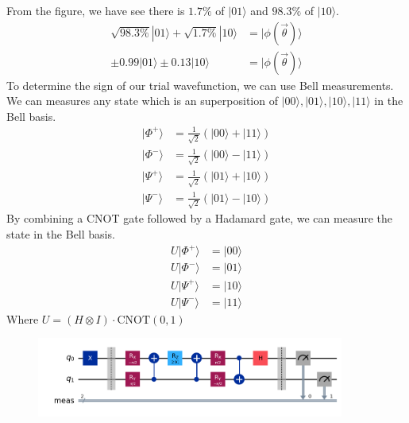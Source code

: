 \documentclass{article}
\begin{document}
\begin{itemize}
    From the figure, we have see there is \(1.7 \% \) of \(|01\rangle\) and \(98.3 \%\) of \(|10\rangle\). 
    \begin{align*}
        \sqrt{98.3 \%}|01\rangle +\sqrt{1.7 \% } |10\rangle &= |\phi(\vec{\theta}) \rangle \\
        \pm 0.99 |01\rangle \pm 0.13 |10\rangle &= |\phi(\vec{\theta}) \rangle
    \end{align*}
    To determine the sign of our trial wavefunction, we can use Bell measurements. We can measures any state which is an superposition of \(|00\rangle, |01\rangle, |10\rangle , |11\rangle\) in the Bell basis.
    \begin{align*}
        |\Phi^+\rangle &= \frac{1}{\sqrt{2}}(|00\rangle + |11\rangle)\\
        |\Phi^-\rangle &= \frac{1}{\sqrt{2}}(|00\rangle - |11\rangle)\\
        |\Psi^+\rangle &= \frac{1}{\sqrt{2}}(|01\rangle + |10\rangle)\\
        |\Psi^-\rangle &= \frac{1}{\sqrt{2}}(|01\rangle - |10\rangle)
    \end{align*}
    By combining a CNOT gate followed by a Hadamard gate, we can measure the state in the Bell basis.
    \begin{align*}
        U |\Phi^+\rangle &= |00\rangle\\
        U |\Phi^-\rangle &= |01\rangle\\
        U |\Psi^+\rangle &= |10\rangle\\
        U |\Psi^-\rangle &= |11\rangle
    \end{align*}
    Where \(U = \left( H \otimes I \right) \cdot \text{CNOT}(0,1)\)
    \begin{figure}[H]
        \centering
        \includegraphics[width=0.9\textwidth, height=0.25\textheight]{BellM.png}
    \end{figure}


\end{itemize}
\end{document}
